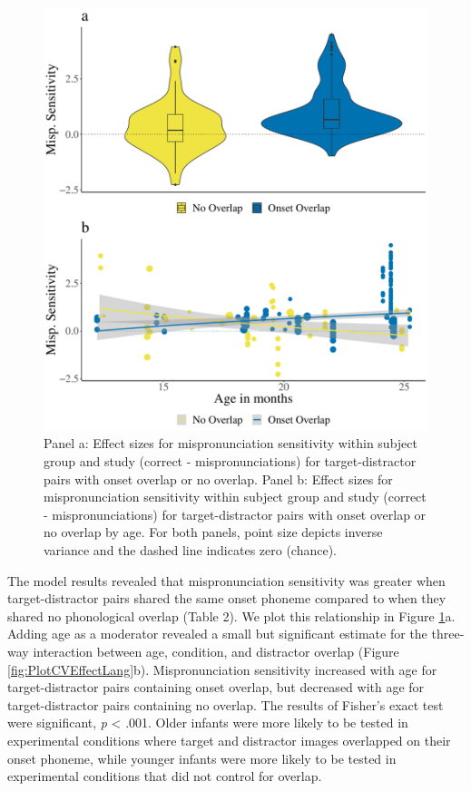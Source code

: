 \documentclass[
  english,
  man, noextraspace]{apa6}
\begin{document}
\begin{figure}
\centering
\includegraphics{VonHolzenBergmann_MPMetaAnalysis_files/figure-latex/PlotDistOverlap-1.pdf}
\caption{\label{fig:PlotDistOverlap}Panel a: Effect sizes for mispronunciation sensitivity within subject group and study (correct - mispronunciations) for target-distractor pairs with onset overlap or no overlap. Panel b: Effect sizes for mispronunciation sensitivity within subject group and study (correct - mispronunciations) for target-distractor pairs with onset overlap or no overlap by age. For both panels, point size depicts inverse variance and the dashed line indicates zero (chance).}
\end{figure}

The model results revealed that mispronunciation sensitivity was greater when target-distractor pairs shared the same onset phoneme compared to when they shared no phonological overlap (Table 2). We plot this relationship in Figure \ref{fig:PlotDistOverlap}a. Adding age as a moderator revealed a small but significant estimate for the three-way interaction between age, condition, and distractor overlap (Figure \ref{fig:PlotCVEffectLang}b). Mispronunciation sensitivity increased with age for target-distractor pairs containing onset overlap, but decreased with age for target-distractor pairs containing no overlap. The results of Fisher's exact test were significant, \emph{p} \textless{} .001. Older infants were more likely to be tested in experimental conditions where target and distractor images overlapped on their onset phoneme, while younger infants were more likely to be tested in experimental conditions that did not control for overlap.
\end{document}
